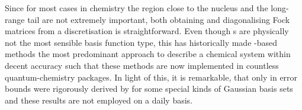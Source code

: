 Since for most cases in chemistry the region close to the nucleus
and the long-range tail are not extremely important,
both obtaining and diagonalising Fock matrices
from a \cGTO discretisation is straightforward.
Even though {\cGTO}s are physically not the most sensible basis function type,
this has historically made \cGTO-based methods
the most predominant approach to describe
a chemical system within decent accuracy
such that these methods are now implemented in countless quantum-chemistry packages.
In light of this, it is remarkable,
that only in \citeyear{Bachmayr2014}
error bounds were rigorously derived by \citet{Bachmayr2014} for some special
kinds of Gaussian basis sets
and these results are not employed on a daily basis.

